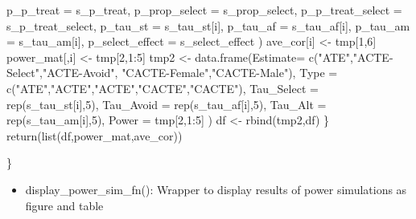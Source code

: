 \documentclass[
]{article}
\newenvironment{Shaded}{\begin{snugshade}}{\end{snugshade}}
\newcommand{\AttributeTok}[1]{\textcolor[rgb]{0.77,0.63,0.00}{#1}}
\newcommand{\DecValTok}[1]{\textcolor[rgb]{0.00,0.00,0.81}{#1}}
\newcommand{\FunctionTok}[1]{\textcolor[rgb]{0.00,0.00,0.00}{#1}}
\newcommand{\NormalTok}[1]{#1}
\newcommand{\OtherTok}[1]{\textcolor[rgb]{0.56,0.35,0.01}{#1}}
\newcommand{\SpecialCharTok}[1]{\textcolor[rgb]{0.00,0.00,0.00}{#1}}
\newcommand{\StringTok}[1]{\textcolor[rgb]{0.31,0.60,0.02}{#1}}
\providecommand{\tightlist}{%
  \setlength{\itemsep}{0pt}\setlength{\parskip}{0pt}}
\begin{document}
\begin{Shaded}
\begin{Highlighting}[]
                    \AttributeTok{p\_p\_treat =}\NormalTok{ s\_p\_treat,}
                    \AttributeTok{p\_prop\_select =}\NormalTok{ s\_prop\_select,}
                    \AttributeTok{p\_p\_treat\_select  =}\NormalTok{ s\_p\_treat\_select,}
                    \AttributeTok{p\_tau\_st  =}\NormalTok{ s\_tau\_st[i],}
                    \AttributeTok{p\_tau\_af  =}\NormalTok{ s\_tau\_af[i],}
                    \AttributeTok{p\_tau\_am  =}\NormalTok{ s\_tau\_am[i],}
                    \AttributeTok{p\_select\_effect  =}\NormalTok{ s\_select\_effect}
\NormalTok{    )}
\NormalTok{    ave\_cor[i] }\OtherTok{\textless{}{-}}\NormalTok{ tmp[}\DecValTok{1}\NormalTok{,}\DecValTok{6}\NormalTok{]}
\NormalTok{    power\_mat[,i] }\OtherTok{\textless{}{-}}\NormalTok{ tmp[}\DecValTok{2}\NormalTok{,}\DecValTok{1}\SpecialCharTok{:}\DecValTok{5}\NormalTok{] }
\NormalTok{    tmp2 }\OtherTok{\textless{}{-}} \FunctionTok{data.frame}\NormalTok{(}\AttributeTok{Estimate=} \FunctionTok{c}\NormalTok{(}\StringTok{"ATE"}\NormalTok{,}\StringTok{"ACTE{-}Select"}\NormalTok{,}\StringTok{"ACTE{-}Avoid"}\NormalTok{,}
                                   \StringTok{"CACTE{-}Female"}\NormalTok{,}\StringTok{"CACTE{-}Male"}\NormalTok{),}
                       \AttributeTok{Type =} \FunctionTok{c}\NormalTok{(}\StringTok{"ATE"}\NormalTok{,}\StringTok{"ACTE"}\NormalTok{,}\StringTok{"ACTE"}\NormalTok{,}\StringTok{"CACTE"}\NormalTok{,}\StringTok{"CACTE"}\NormalTok{),}
                       \AttributeTok{Tau\_Select =} \FunctionTok{rep}\NormalTok{(s\_tau\_st[i],}\DecValTok{5}\NormalTok{),}
                       \AttributeTok{Tau\_Avoid =} \FunctionTok{rep}\NormalTok{(s\_tau\_af[i],}\DecValTok{5}\NormalTok{),}
                       \AttributeTok{Tau\_Alt =} \FunctionTok{rep}\NormalTok{(s\_tau\_am[i],}\DecValTok{5}\NormalTok{),}
                       \AttributeTok{Power =}\NormalTok{ tmp[}\DecValTok{2}\NormalTok{,}\DecValTok{1}\SpecialCharTok{:}\DecValTok{5}\NormalTok{] }
\NormalTok{    )}
\NormalTok{    df }\OtherTok{\textless{}{-}} \FunctionTok{rbind}\NormalTok{(tmp2,df)}
\NormalTok{  \}}
  \FunctionTok{return}\NormalTok{(}\FunctionTok{list}\NormalTok{(df,power\_mat,ave\_cor))}
  
\NormalTok{\}}
\end{Highlighting}
\end{Shaded}

\begin{itemize}
\tightlist
\item
  display\_power\_sim\_fn(): Wrapper to display results of power
  simulations as figure and table
\end{itemize}
\end{document}
